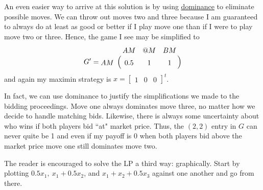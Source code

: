 \documentclass[11pt, oneside]{article}
\begin{document}
An even easier way to arrive at this solution is by using 
\href{http://en.wikipedia.org/wiki/Strategic_dominance}{\uline{dominance}}
to eliminate possible moves. We can throw out
moves two and three because I am guaranteed to always do at least as good or
better if I play move one than if I were to play 
move two or three. Hence, the game I see may be simplified to
\begin{align*}
G' = \bordermatrix{
      &   AM & @M & BM\cr
      AM & 0.5 & 1 & 1}
\end{align*}
and again my maximin strategy is $x = \begin{bmatrix}1 & 0 & 0 \end{bmatrix}^t$.

In fact, we can use dominance to justify the simplifications we made to the bidding proceedings. Move one always dominates move
three, no matter how we decide to handle matching bids. Likewise,
there is always some uncertainty about who wins if
both players bid ``at" market price. Thus, the $(2, 2)$ entry in
$G$ can never quite be 1 and even if my payoff is 0 when both players bid above the market price move one still dominates move two.



The reader is encouraged to solve the LP a third way: graphically. Start by plotting 
$0.5x_1,~x_1 + 0.5x_2$, and $x_1 + x_2 + 0.5x_3$ against one another
and go from there.
\end{document}
